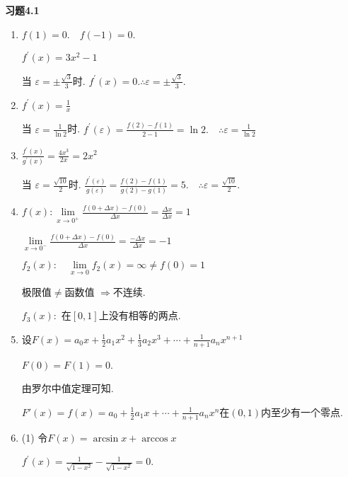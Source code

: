 \documentclass{article}
\begin{document}
	\pagestyle{empty}
	\begin{center}
		{\bf 习题4.1}
	\end{center}
	
		\begin{enumerate}[1.]
			\item $f(1) =0 . \quad f(-1)=0.$
			
				$f^{\prime}(x) =3 x^{2}-1$
			
				当 $\varepsilon=\pm \frac{\sqrt{3}}{3}$时. $f^{\prime}(x)=0. \therefore \varepsilon=\pm \frac{\sqrt{3}}{3}.$
			\item $f^{\prime}(x)=\frac{1}{x}$
			
				当 $\varepsilon=\frac{1}{\ln 2}$时. $f^{\prime}(\varepsilon)=\frac{f(2)-f(1)}{2-1}=\ln 2 . \quad \therefore \varepsilon=\frac{1}{\ln 2}$
				
			\item $\frac{f^{\prime}(x)}{g^{\prime}(x)}=\frac{4 x^{3}}{2 x}=2 x^{2}$
				
				当 $\varepsilon=\frac{\sqrt{10}}{2}$时. $\frac{f^{\prime}(\varepsilon)}{g(\varepsilon)}=\frac{f(2)-f(1)}{g(2)-g(1)}=5 . \quad \therefore \varepsilon=\frac{\sqrt{10}}{2}$.
				
			\item $f(x): \lim\limits_{x \rightarrow 0^{+}} \frac{f(0+\Delta x)-f(0)}{\Delta x}=\frac{\Delta x}{\Delta x}=1$
			
				$\lim\limits_{x \rightarrow 0^{-}} \frac{f(0+\Delta x)-f(0)}{\Delta x}=\frac{-\Delta x}{\Delta x}=-1$
				
				$f_{2}(x): \quad \lim\limits_{x \rightarrow 0} f_{2}(x)=\infty \neq f(0)=1$
				
				极限值$\neq$函数值 $\Longrightarrow$不连续.
				
				$f_3(x):$ 在$[0, 1]$上没有相等的两点. 
				
			\item 设$F(x)=a_{0} x+\frac{1}{2} a_{1} x^{2}+\frac{1}{3} a_{2} x^{3}+\cdots+\frac{1}{n+1} a_{n} x^{n+1}$
			
				$F(0)=F(1)=0$.
				
				由罗尔中值定理可知.
				
				$F'(x)=f(x)=a_{0}+\frac{1}{2} a_{1} x+\cdots +\frac{1}{n+1} a_{n} x^{n}$在$(0, 1)$内至少有一个零点.
			
			\item (1) 令$F(x)=\arcsin x+\arccos x$
				
				$f^{\prime}(x)=\frac{1}{\sqrt{1-x^{2}}}-\frac{1}{\sqrt{1-x^{2}}}=0$.
				

\end{enumerate}
\end{document}
